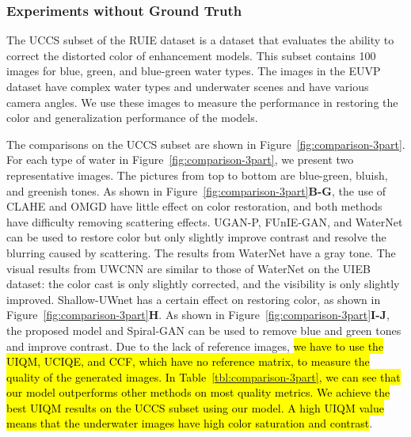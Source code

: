 \documentclass[utf8]{FrontiersinHarvard} %
\begin{document}
\subsubsection{Experiments without Ground Truth}
The UCCS subset of the RUIE dataset is a dataset that evaluates the ability to correct the distorted color of enhancement models. This subset contains 100 images for blue, green, and blue-green water types. The images in the EUVP dataset have complex water types and underwater scenes and have various camera angles. We use these images to measure the performance in restoring the color and generalization performance of the models. 

The comparisons on the UCCS subset are shown in Figure~\ref{fig:comparison-3part}. For each type of water in Figure~\ref{fig:comparison-3part}, we present two representative images. The pictures from top to bottom are blue-green, bluish, and greenish tones. As shown in Figure~\ref{fig:comparison-3part}\textbf{B-G}, the use of CLAHE and OMGD have little effect on color restoration, and both methods have difficulty removing scattering effects. UGAN-P, FUnIE-GAN, and WaterNet can be used to restore color but only slightly improve contrast and resolve the blurring caused by scattering. The results from WaterNet have a gray tone. The visual results from UWCNN are similar to those of WaterNet on the UIEB dataset: 
the color cast is only slightly corrected, and the visibility is only slightly improved.
 Shallow-UWnet has a certain effect on restoring color, as shown in Figure~\ref{fig:comparison-3part}\textbf{H}. As shown in Figure~\ref{fig:comparison-3part}\textbf{I-J}, the proposed model and Spiral-GAN can be used to remove blue and green tones and improve contrast. Due to the lack of reference images, \hl{we have to use the UIQM, UCIQE, and CCF, which have no reference matrix, to measure the quality of the generated images. In Table~\ref{tbl:comparison-3part}, we can see that our model outperforms other methods on most quality metrics. We achieve the best UIQM results on the UCCS subset using our model. A high UIQM value means that the underwater images have high color saturation and contrast}.
\end{document}
